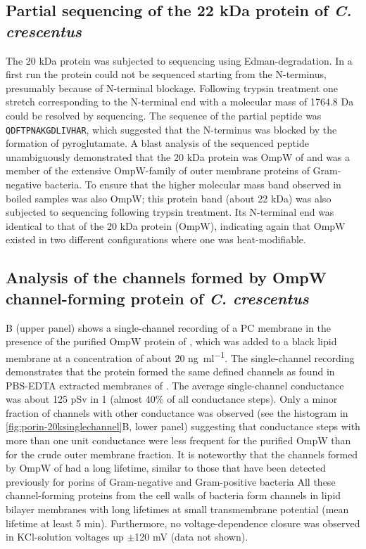 \subsection{Partial sequencing of the 22 kDa protein of \textit{C. crescentus}}
The 20 kDa protein was subjected to sequencing using Edman-degradation. In a first run the protein could not be sequenced starting from the N-terminus, presumably because of N-terminal blockage. Following trypsin treatment one stretch corresponding to the N-terminal end with a molecular mass of 1764.8 Da could be resolved by sequencing. The sequence of the partial peptide was \texttt{QDFTPNAKGDLIVHAR}, which suggested that the N-terminus was blocked by the formation of pyroglutamate. A \ac{blast} analysis of the sequenced peptide unambiguously demonstrated that the 20 kDa protein was OmpW of \caulobacter and was a member of the extensive OmpW-family of outer membrane proteins of Gram-negative bacteria. To ensure that the higher molecular mass band observed in boiled samples was also OmpW; this protein band (about 22 kDa) was also subjected to sequencing following trypsin treatment. Its N-terminal end was identical to that of the 20 kDa protein (OmpW), indicating again that OmpW existed in two different configurations where one was heat-modifiable. 

\subsection{Analysis of the channels formed by OmpW channel-forming protein of \textit{C. crescentus}}

B (upper panel) shows a single-channel recording of a \ac{PC} membrane in the presence of the purified OmpW protein of \caulobacter, which was added to a black lipid membrane at a concentration of about 20 \si{\nano\gram\per\milli\litre}. The single-channel recording demonstrates that the protein formed the same defined channels as found in \ac{PBS}-\ac{EDTA} extracted membranes of \caulobacter. The average single-channel conductance was about 125 \si{\pico\sievert} in 1 \si{\molar}  (almost 40\% of all conductance steps). Only a minor fraction of channels with other conductance was observed (see the histogram in \cref{fig:porin-20ksinglechannel}B, lower panel) suggesting that conductance steps with more than one unit conductance were less frequent for the purified OmpW than for the crude outer membrane fraction. It is noteworthy that the channels formed by OmpW of \caulobacter had a long lifetime, similar to those that have been detected previously for porins of Gram-negative and Gram-positive bacteria All these channel-forming proteins from the cell walls of bacteria form channels in lipid bilayer membranes with long lifetimes at small transmembrane potential (mean lifetime at least 5 min). Furthermore, no voltage-dependence closure was observed in KCl-solution voltages up $\pm$120 mV (data not shown). 

